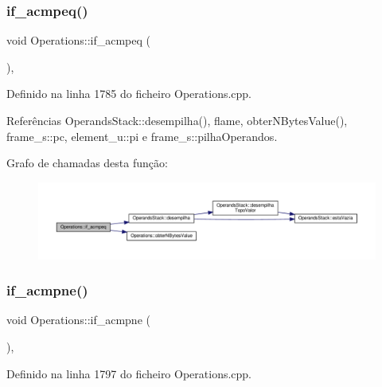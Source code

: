\subsubsection{\texorpdfstring{if\+\_\+acmpeq()}{if\_acmpeq()}}
{\footnotesize\ttfamily void Operations\+::if\+\_\+acmpeq (\begin{DoxyParamCaption}{ }\end{DoxyParamCaption})\hspace{0.3cm}{\ttfamily [static]}, {\ttfamily [private]}}



Definido na linha 1785 do ficheiro Operations.\+cpp.



Referências Operands\+Stack\+::desempilha(), flame, obter\+N\+Bytes\+Value(), frame\+\_\+s\+::pc, element\+\_\+u\+::pi e frame\+\_\+s\+::pilha\+Operandos.

Grafo de chamadas desta função\+:
\nopagebreak
\begin{figure}[H]
\begin{center}
\leavevmode
\includegraphics[width=350pt]{classOperations_aa0432645b0d0effb4d4d839ea2dcec1c_cgraph}
\end{center}
\end{figure}
\mbox{\label{classOperations_a7f43bbfba9b2feb66b695d24c43dc430}} 
\subsubsection{\texorpdfstring{if\+\_\+acmpne()}{if\_acmpne()}}
{\footnotesize\ttfamily void Operations\+::if\+\_\+acmpne (\begin{DoxyParamCaption}{ }\end{DoxyParamCaption})\hspace{0.3cm}{\ttfamily [static]}, {\ttfamily [private]}}



Definido na linha 1797 do ficheiro Operations.\+cpp.



